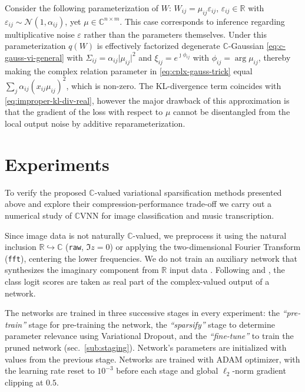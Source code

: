 \documentclass[a4paper,10pt,twocolumn]{article}
\newcommand{\real}{\mathbb{R}}
\newcommand{\cplx}{\mathbb{C}}
\newcommand{\iu}{{\jmath}}
\begin{document}
Consider the following parameterization of $W$: $
  W_{ij} = \mu_{ij} \varepsilon_{ij}
$, $\varepsilon_{ij} \in \real$ with $
  \varepsilon_{ij} \sim \mathcal{N}(1, \alpha_{ij})
$, yet $\mu \in \cplx^{n \times m}$. This case corresponds to inference regarding
multiplicative noise $\varepsilon$ rather than the parameters themselves. Under
this parameterization $q(W)$ is effectively factorized degenerate $\cplx$-Gaussian
\eqref{eq:c-gauss-vi-general} with $
  \Sigma_{ij} = \alpha_{ij} \lvert \mu_{ij} \rvert^2
$ and $
  \xi_{ij} = e^{\iu \phi_{ij}}
$ with $\phi_{ij} = \arg \mu_{ij}$, thereby making the complex relation parameter
in \eqref{eq:cplx-gauss-trick} equal $
  \sum_j \alpha_{ij} (x_{ij} \mu_{ij})^2
$, which is non-zero.
%
The KL-divergence term coincides with \eqref{eq:improper-kl-div-real}, however the major
drawback of this approximation is that the gradient of the loss with respect to $\mu$ cannot
be disentangled from the local output noise by additive reparameterization.





\section{Experiments} %
\label{sec:experiments}

To verify the proposed $\cplx$-valued variational sparsification methods presented
above and explore their compression-performance trade-off we carry out a numerical
study of $\cplx$VNN for image classification and music transcription.

Since image data is not naturally $\cplx$-valued, we preprocess it using the natural
inclusion $\real \hookrightarrow \cplx$ (\texttt{raw}, $\Im z = 0$) or applying the
two-dimensional Fourier Transform (\texttt{fft}), centering the lower frequencies. We
do not train an auxiliary network that synthesizes the imaginary component from $\real$
input data \citep{trabelsi_deep_2018}.
%
Following \citet{wolter_complex_2018} and \citet{trabelsi_deep_2018}, the class logit
scores are taken as real part of the complex-valued output of a network.

The networks are trained in three successive stages in every experiment: the \emph{``pre-train''}
stage for pre-training the network, the \emph{``sparsify''} stage to determine parameter
relevance using Variational Dropout, and the \emph{``fine-tune''} to train the pruned
network (sec.~\ref{sub:staging}). Network's parameters are initialized with values from
the previous stage.
%
Networks are trained with ADAM optimizer, with the learning rate reset to $10^{-3}$ before
each stage and global $\ell_2$-norm gradient clipping at $0.5$.
\end{document}
